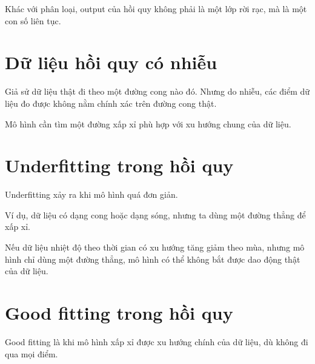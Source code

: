\documentclass[12pt,a4paper]{report}
\begin{document}
Khác với phân loại, output của hồi quy không phải là một lớp rời rạc, mà là một con số liên tục.

\section{Dữ liệu hồi quy có nhiễu}

Giả sử dữ liệu thật đi theo một đường cong nào đó. Nhưng do nhiễu, các điểm dữ liệu đo được không nằm chính xác trên đường cong thật.

Mô hình cần tìm một đường xấp xỉ phù hợp với xu hướng chung của dữ liệu.

\section{Underfitting trong hồi quy}

Underfitting xảy ra khi mô hình quá đơn giản.

Ví dụ, dữ liệu có dạng cong hoặc dạng sóng, nhưng ta dùng một đường thẳng để xấp xỉ.

\begin{center}
\end{center}

\begin{vidu}
Nếu dữ liệu nhiệt độ theo thời gian có xu hướng tăng giảm theo mùa, nhưng mô hình chỉ dùng một đường thẳng, mô hình có thể không bắt được dao động thật của dữ liệu.
\end{vidu}

\section{Good fitting trong hồi quy}

Good fitting là khi mô hình xấp xỉ được xu hướng chính của dữ liệu, dù không đi qua mọi điểm.
\end{document}
